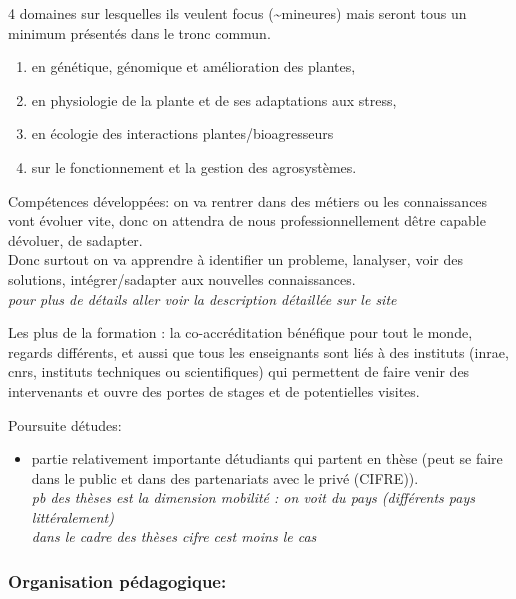 \documentclass[
]{article}
\providecommand{\tightlist}{%
  \setlength{\itemsep}{0pt}\setlength{\parskip}{0pt}}
\begin{document}
4 domaines sur lesquelles ils veulent focus (\textasciitilde mineures)
mais seront tous un minimum présentés dans le tronc commun.

\begin{enumerate}
\tightlist
\item
  en génétique, génomique et amélioration des plantes,
\item
  en physiologie de la plante et de ses adaptations aux stress,
\item
  en écologie des interactions plantes/bioagresseurs
\item
  sur le fonctionnement et la gestion des agrosystèmes.
\end{enumerate}

Compétences développées: on va rentrer dans des métiers ou les
connaissances vont évoluer vite, donc on attendra de nous
professionnellement d\textquotesingle être capable
d\textquotesingle évoluer, de s\textquotesingle adapter.\\
Donc surtout on va apprendre à identifier un probleme,
l\textquotesingle analyser, voir des solutions,
intégrer/s\textquotesingle adapter aux nouvelles connaissances.\\
\emph{pour plus de détails aller voir la description détaillée sur le
site}

Les plus de la formation : la co-accréditation bénéfique pour tout le
monde, regards différents, et aussi que tous les enseignants sont liés à
des instituts (inrae, cnrs, instituts techniques ou scientifiques) qui
permettent de faire venir des intervenants et ouvre des portes de stages
et de potentielles visites.

Poursuite d\textquotesingle études:

\begin{itemize}
\tightlist
\item
  partie relativement importante d\textquotesingle étudiants qui partent
  en thèse (peut se faire dans le public et dans des partenariats avec
  le privé (CIFRE)).\\
  \emph{pb des thèses est la dimension mobilité : on voit du pays
  (différents pays littéralement)}\\
  \emph{dans le cadre des thèses cifre c\textquotesingle est moins le
  cas}
\end{itemize}

\hypertarget{organisation-puxe9dagogique}{%
\subsubsection{Organisation
pédagogique:}\label{organisation-puxe9dagogique}}
\end{document}
